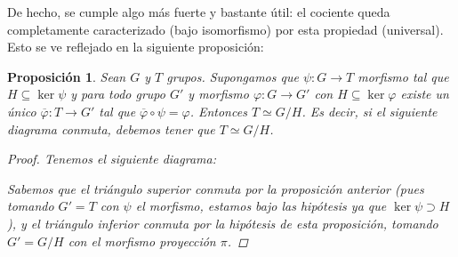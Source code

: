 \documentclass[12pt]{book}
\newtheorem{prop}[teo]{Proposición}
\theoremstyle{definition}
\begin{document}
De hecho, se cumple algo más fuerte y bastante útil: el cociente queda completamente caracterizado (bajo isomorfismo) por esta propiedad (universal). Esto se ve reflejado en la siguiente proposición:

\begin{prop}
Sean $G$ y $T$ grupos. Supongamos que $\psi:G\to T$ morfismo tal que $H \subseteq \ker \psi$ y para todo grupo $G'$ y morfismo $\varphi:G\to G'$ con $H\subseteq \ker \varphi$ existe un único $\overline{\varphi}:T\to G'$ tal que $\overline{\varphi}\circ \psi = \varphi$. Entonces $T\simeq G/H$. Es decir, si el siguiente diagrama conmuta, debemos tener que $T\simeq G/H$. 

\begin{center}
\end{center}

\begin{proof}
Tenemos el siguiente diagrama:

\begin{center}
\end{center}

Sabemos que el triángulo superior conmuta por la proposición anterior (pues tomando $G'=T$ con $\psi$ el morfismo, estamos bajo las hipótesis ya que $\ker \psi \supset H$), y el triángulo inferior conmuta por la hipótesis de esta proposición, tomando $G'=G/H$ con el morfismo proyección $\pi$.


\end{proof}
\end{prop}
\end{document}
